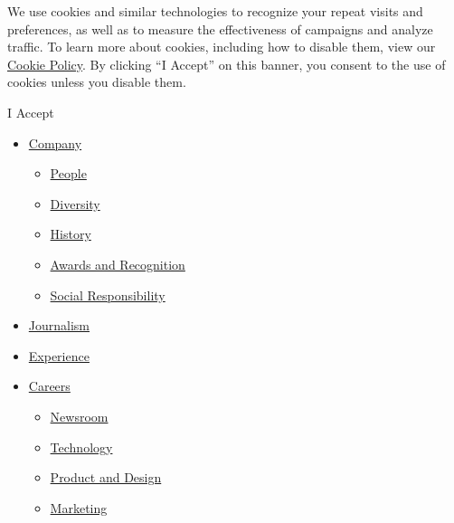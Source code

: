 We use cookies and similar technologies to recognize your repeat visits
and preferences, as well as to measure the effectiveness of campaigns
and analyze traffic. To learn more about cookies, including how to
disable them, view our \href{/policy}{Cookie Policy}. By clicking ``I
Accept'' on this banner, you consent to the use of cookies unless you
disable them.

I Accept

\begin{itemize}
\tightlist
\item
  \href{https://www.nytco.com/company/}{Company}

  \begin{itemize}
  \tightlist
  \item
    \href{https://www.nytco.com/company/people/}{People}
  \item
    \href{https://www.nytco.com/company/diversity-and-inclusion/}{Diversity}
  \item
    \href{https://www.nytco.com/company/history/}{History}
  \item
    \href{https://www.nytco.com/company/prizes-awards/}{Awards and
    Recognition}
  \item
    \href{https://www.nytco.com/social-responsibility/}{Social
    Responsibility}
  \end{itemize}
\item
  \href{https://www.nytco.com/journalism/}{Journalism}
\item
  \href{https://www.nytco.com/experience-the-times/}{Experience}
\item
  \href{https://www.nytco.com/careers/}{Careers}

  \begin{itemize}
  \tightlist
  \item
    \href{https://www.nytco.com/careers/newsroom/}{Newsroom}
  \item
    \href{https://www.nytco.com/careers/technology/}{Technology}
  \item
    \href{https://www.nytco.com/careers/product-and-design/}{Product and
    Design}
  \item
    \href{https://www.nytco.com/careers/marketing/}{Marketing}
  \end{itemize}
\end{itemize}

